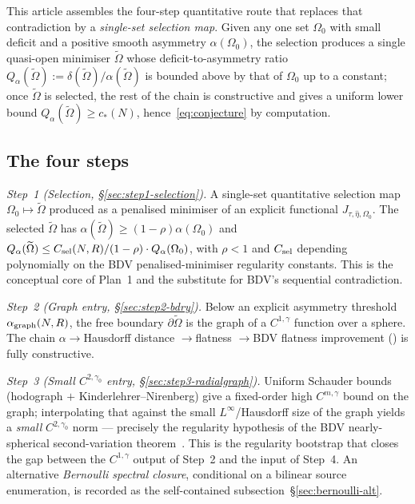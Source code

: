 \documentclass[11pt]{amsart}
\theoremstyle{definition}
\begin{document}
This article assembles the four-step quantitative route that replaces
that contradiction by a \emph{single-set selection map}.  Given any
one set $\Omega_0$ with small deficit and a positive smooth asymmetry
$\alpha(\Omega_0)$, the selection produces a single quasi-open
minimiser $\widetilde\Omega$ whose deficit-to-asymmetry ratio
$Q_\alpha(\widetilde\Omega):=\delta(\widetilde\Omega)/\alpha
(\widetilde\Omega)$ is bounded above by that of $\Omega_0$ up to a
constant; once $\widetilde\Omega$ is selected, the rest of the chain
is constructive and gives a uniform lower bound
$Q_\alpha(\widetilde\Omega)\ge c_*(N)$, hence~\eqref{eq:conjecture}
by computation.

\subsection*{The four steps}

\noindent\emph{Step~1 (Selection, \S\ref{sec:step1-selection}).}  A
single-set quantitative selection map $\Omega_0\mapsto\widetilde
\Omega$ produced as a penalised minimiser of an explicit functional
$J_{\tau,\hat\eta,\Omega_0}$.  The selected $\widetilde\Omega$ has
$\alpha(\widetilde\Omega)\ge(1-\rho)\alpha(\Omega_0)$ and
$Q_\alpha(\widetilde\Omega)\le C_{\rm sel}(N,R)/(1-\rho)\cdot
Q_\alpha(\Omega_0)$, with $\rho<1$ and $C_{\rm sel}$ depending
polynomially on the BDV penalised-minimiser regularity constants.
This is the conceptual core of Plan~1 and the substitute for BDV's
sequential contradiction.

\smallskip
\noindent\emph{Step~2 (Graph entry, \S\ref{sec:step2-bdry}).}  Below
an explicit asymmetry threshold $\alpha_{\rm graph}(N,R)$, the free
boundary $\partial\widetilde\Omega$ is the graph of a $C^{1,\gamma}$
function over a sphere.  The chain $\alpha\to$Hausdorff distance
$\to$flatness $\to$BDV flatness improvement
(\cite[Theorem~4.18]{BDV2015}) is fully constructive.

\smallskip
\noindent\emph{Step~3 (Small $C^{2,\gamma_0}$ entry,
\S\ref{sec:step3-radialgraph}).}  Uniform Schauder bounds (hodograph
$+$ Kinderlehrer--Nirenberg) give a fixed-order high $C^{m,\gamma}$
bound on the graph; interpolating that against the small
$L^{\infty}$/Hausdorff size of the graph yields a \emph{small}
$C^{2,\gamma_0}$ norm --- precisely the regularity hypothesis of the
BDV nearly-spherical second-variation
theorem~\cite[Theorem~3.3]{BDV2015}.  This is the regularity bootstrap
that closes the gap between the $C^{1,\gamma}$ output of Step~2 and
the input of Step~4.  An alternative \emph{Bernoulli spectral
closure}, conditional on a bilinear source enumeration, is recorded as
the self-contained subsection~\S\ref{sec:bernoulli-alt}.
\end{document}
